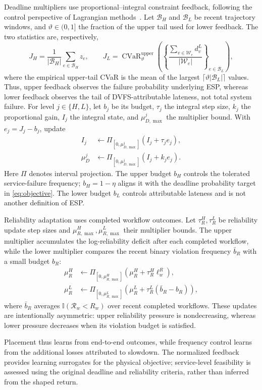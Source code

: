 \documentclass[lettersize,journal]{IEEEtran}
\begin{document}
Deadline multipliers use proportional--integral constraint feedback,
following the control perspective of Lagrangian
methods~\cite{stooke2020}. Let $\mathcal B_H$ and $\mathcal B_L$ be recent
trajectory windows, and $\vartheta\in(0,1]$ the fraction of the upper
tail used for lower feedback. The two statistics are, respectively,
\begin{equation}
 J_H=\frac{1}{|\mathcal B_H|}\sum_{e\in\mathcal B_H}z_e,
 \qquad
 J_L=\operatorname{CVaR}^{\mathrm{upper}}_{\vartheta}
 \left(\left\{\frac{\sum_{v\in\mathcal W_e}d_v^L}{|\mathcal W_e|}
 \right\}_{e\in\mathcal B_L}\right),
 \label{eq:method_dual_statistics}
\end{equation}
where the empirical upper-tail CVaR is the mean of the largest
$\lceil\vartheta|\mathcal B_L|\rceil$ values. Thus, upper feedback observes
the failure probability underlying ESP, whereas lower feedback
observes the tail of DVFS-attributable lateness, not total system
failure. For level $j\in\{H,L\}$, let $b_j$ be its budget, $\tau_j$
the integral step size, $k_j$ the proportional gain, $I_j$ the integral
state, and $\mu_{D,\max}^j$ the multiplier bound. With
$e_j=J_j-b_j$, update
\begin{align}
 I_j&\leftarrow\Pi_{[0,\mu_{D,\max}^j]}(I_j+\tau_j e_j),\nonumber\\
 \mu_D^j&\leftarrow\Pi_{[0,\mu_{D,\max}^j]}(I_j+k_j e_j).
 \label{eq:method_pi_dual}
\end{align}
Here $\Pi$ denotes interval projection. The upper budget $b_H$ controls the tolerated service-failure
frequency; $b_H=1-\eta$ aligns it with the deadline probability target
in \eqref{eq:objective}. The lower budget $b_L$ controls attributable
lateness and is not another definition of ESP.

Reliability adaptation uses completed workflow outcomes. Let
$\tau_R^H,\tau_R^L$ be reliability update step sizes and
$\mu_{R,\max}^H,\mu_{R,\max}^L$ their multiplier bounds. The upper
multiplier accumulates the log-reliability deficit after each completed
workflow, while the lower multiplier compares the recent binary
violation frequency $\bar b_R$ with a small budget $b_R$:
\begin{align}
 \mu_R^H&\leftarrow
 \Pi_{[0,\mu_{R,\max}^H]}(\mu_R^H+\tau_R^H\ell_w^R),\nonumber\\
 \mu_R^L&\leftarrow
 \Pi_{[0,\mu_{R,\max}^L]}(\mu_R^L+\tau_R^L(\bar b_R-b_R)),
 \label{eq:method_reliability_duals}
\end{align}
where $\bar b_R$ averages $\mathbb{I}(\mathcal R_w<R_w)$ over recent
completed workflows. These updates are intentionally asymmetric: upper reliability
pressure is nondecreasing, whereas lower pressure decreases when its
violation budget is satisfied.

Placement thus learns from end-to-end outcomes, while frequency control
learns from the additional losses attributed to slowdown. The normalized
feedback provides learning surrogates for the physical objective;
service-level feasibility is assessed using the original deadline and
reliability criteria, rather than inferred from the shaped return.






\end{document}
